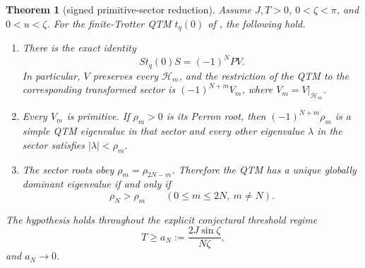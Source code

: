 \documentclass[11pt]{article}
\newtheorem{theorem}{Theorem}
\newcommand{\cH}{\mathcal H}
\begin{document}
\begin{theorem}[signed primitive-sector reduction]\label{thm:main}
Assume $J,T>0$, $0<\zeta<\pi$, and $0<u<\zeta$.  For the finite-Trotter QTM
$t_q(0)$ of \cite{FGK}, the following hold.
\begin{enumerate}
\item There is the exact identity
\[
 S t_q(0)S=(-1)^N P V.
 \tag{4.1}
\]
In particular, $V$ preserves every $\cH_m$, and the restriction of the QTM
to the corresponding transformed sector is $(-1)^{N+m}V_m$, where
$V_m=V|_{\cH_m}$.
\item Every $V_m$ is primitive.  If $\rho_m>0$ is its Perron root, then
$(-1)^{N+m}\rho_m$ is a simple QTM eigenvalue in that sector and every other
eigenvalue $\lambda$ in the sector satisfies $|\lambda|<\rho_m$.
\item The sector roots obey $\rho_m=\rho_{2N-m}$.  Therefore the QTM has a
unique globally dominant eigenvalue if and only if
\[
 \rho_N>\rho_m\qquad(0\leq m\leq2N,\ m\neq N).
 \tag{4.2}
\]
\end{enumerate}
The hypothesis holds throughout the explicit conjectural threshold regime
\[
 T\geq a_N:=\frac{2J\sin\zeta}{N\zeta},
 \tag{4.3}
\]
and $a_N\to0$.
\end{theorem}
\end{document}
